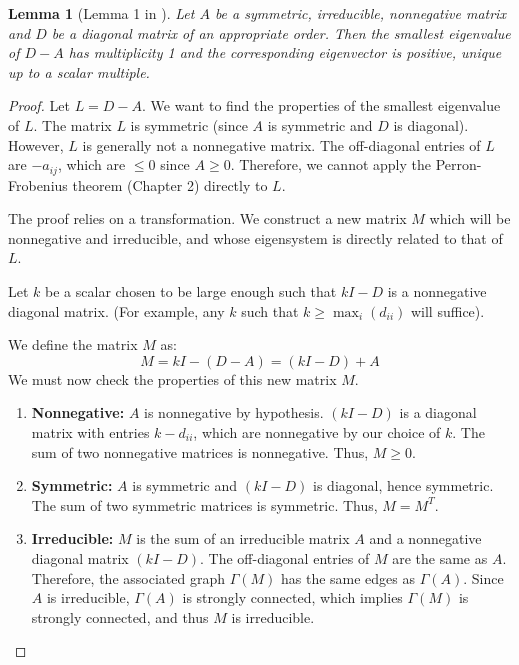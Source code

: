 \documentclass[12pt,a4paper]{report}
\theoremstyle{plain}
\newtheorem{lemma}[theorem]{Lemma}
\theoremstyle{definition}
\theoremstyle{remark}
\begin{document}
\begin{lemma}[Lemma 1 in \cite{main_paper}]\label{lem:paper_lemma1}
Let $A$ be a symmetric, irreducible, nonnegative matrix and $D$ be a diagonal matrix of an appropriate order. Then the smallest eigenvalue of $D-A$ has multiplicity 1 and the corresponding eigenvector is positive, unique up to a scalar multiple.
\end{lemma}
\begin{proof}
Let $L = D-A$. We want to find the properties of the smallest eigenvalue of $L$.
The matrix $L$ is symmetric (since $A$ is symmetric and $D$ is diagonal). However, $L$ is generally not a nonnegative matrix. The off-diagonal entries of $L$ are $-a_{ij}$, which are $\le 0$ since $A \ge 0$.
Therefore, we cannot apply the Perron-Frobenius theorem (Chapter 2) directly to $L$.

The proof relies on a transformation. We construct a new matrix $M$ which will be nonnegative and irreducible, and whose eigensystem is directly related to that of $L$.

Let $k$ be a scalar chosen to be large enough such that $kI - D$ is a nonnegative diagonal matrix. (For example, any $k$ such that $k \ge \max_i(d_{ii})$ will suffice).

We define the matrix $M$ as:
$$ M = kI - (D-A) = (kI - D) + A $$
We must now check the properties of this new matrix $M$.
\begin{enumerate}
    \item \textbf{Nonnegative:} $A$ is nonnegative by hypothesis. $(kI - D)$ is a diagonal matrix with entries $k - d_{ii}$, which are nonnegative by our choice of $k$. The sum of two nonnegative matrices is nonnegative. Thus, $M \ge 0$.
    
    \item \textbf{Symmetric:} $A$ is symmetric and $(kI - D)$ is diagonal, hence symmetric. The sum of two symmetric matrices is symmetric. Thus, $M = M^T$.
    
    \item \textbf{Irreducible:} $M$ is the sum of an irreducible matrix $A$ and a nonnegative diagonal matrix $(kI-D)$. The off-diagonal entries of $M$ are the same as $A$. Therefore, the associated graph $\Gamma(M)$ has the same edges as $\Gamma(A)$. Since $A$ is irreducible, $\Gamma(A)$ is strongly connected, which implies $\Gamma(M)$ is strongly connected, and thus $M$ is irreducible.
\end{enumerate}


\end{proof}
\end{document}

